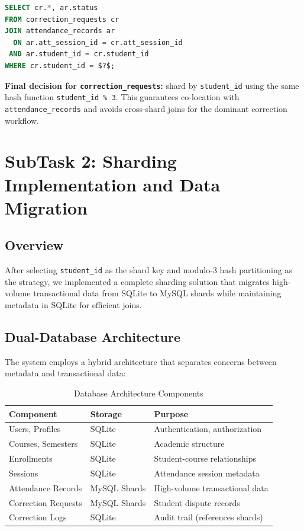 \documentclass[conference]{IEEEtran}
\begin{document}
\begin{lstlisting}[language=SQL]
SELECT cr.*, ar.status
FROM correction_requests cr
JOIN attendance_records ar
  ON ar.att_session_id = cr.att_session_id
 AND ar.student_id = cr.student_id
WHERE cr.student_id = $?$;
\end{lstlisting}

\textbf{Final decision for \texttt{correction\_requests}:} shard by \texttt{student\_id} using the same hash function \texttt{student\_id \% 3}. This guarantees co-location with \texttt{attendance\_records} and avoids cross-shard joins for the dominant correction workflow.


\section{SubTask 2: Sharding Implementation and Data Migration}

\subsection{Overview}

After selecting \texttt{student\_id} as the shard key and modulo-3 hash partitioning as the strategy, we implemented a complete sharding solution that migrates high-volume transactional data from SQLite to MySQL shards while maintaining metadata in SQLite for efficient joins.

\subsection{Dual-Database Architecture}

The system employs a hybrid architecture that separates concerns between metadata and transactional data:

\begin{table}[htbp]
\caption{Database Architecture Components}
\centering
\begin{tabular}{|p{2.5cm}|p{2.2cm}|p{2.5cm}|}
\hline
\textbf{Component} & \textbf{Storage} & \textbf{Purpose} \\
\hline
Users, Profiles & SQLite & Authentication, authorization \\
\hline
Courses, Semesters & SQLite & Academic structure \\
\hline
Enrollments & SQLite & Student-course relationships \\
\hline
Sessions & SQLite & Attendance session metadata \\
\hline
Attendance Records & MySQL Shards & High-volume transactional data \\
\hline
Correction Requests & MySQL Shards & Student dispute records \\
\hline
Correction Logs & SQLite & Audit trail (references shards) \\
\hline
\end{tabular}
\label{tab:db_architecture}
\end{table}
\end{document}
